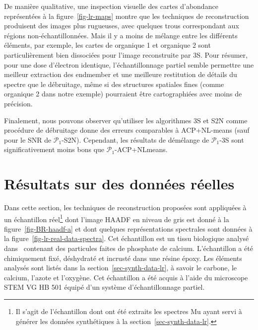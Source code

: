 De manière qualitative, une inspection visuelle des cartes d'abondance représentées à la figure~\ref{fig-lr-maps} montre que les techniques de reconstruction produisent des images plus rugueuses, avec quelques trous correspondant aux régions non-échantillonnées. Mais il y a moins de mélange entre les différents éléments, par exemple, les cartes de organique 1 et organique 2 sont particulièrement bien dissociées pour l'image reconstruite par 3S. Pour résumer, pour une dose d'électron identique, l'échantillonnage partiel semble permettre une meilleur extraction des endmember et une meilleure restitution de détails du spectre que le débruitage, même si des structures spatiales fines (comme organique 2 dans notre exemple) pourraient être cartographiées avec moins de précision.

Finalement, nous pouvons observer qu'utiliser les algorithmes 3S et S2N comme procédure de débruitage donne des erreurs comparables à ACP+NL-means (sauf pour le SNR de $\mathcal{P}_1$-S2N). Cependant, les résultats de démélange de $\mathcal{P}_1$-3S sont significativement moins bons que $\mathcal{P}_1$-ACP+NLmeans. 



%
\section{Résultats sur des données réelles}\label{sec-3s-real-data}

Dans cette section, les techniques de reconstruction proposées sont appliquées à un échantillon réel\footnote{Il s'agit de l'échantillon dont ont été extraits les spectres \gls{Mu} ayant servi à générer les données synthétiques à la section~\ref{sec-synth-data-lr}.} dont l'image HAADF en niveau de gris est donné à la figure~\ref{fig-BR-haadf-a} et dont quelques représentations spectrales sont données à la figure~\ref{fig-lr-real-data-spectra}. 
%
Cet échantillon est un tissu biologique analysé dans~\cite{gay2020nanoscale} contenant des particules faites de phosphate de calcium. L'échantillon a été chimiquement fixé, déshydraté et incrusté dans une résine époxy. Les éléments analysés sont listés dans la section~\ref{sec-synth-data-lr}, à savoir le carbone, le calcium, l'azote et l'oxygène. Cet échantillon a été acquis à l'aide du microscope STEM VG HB 501 équipé d'un système d'échantillonnage partiel.

